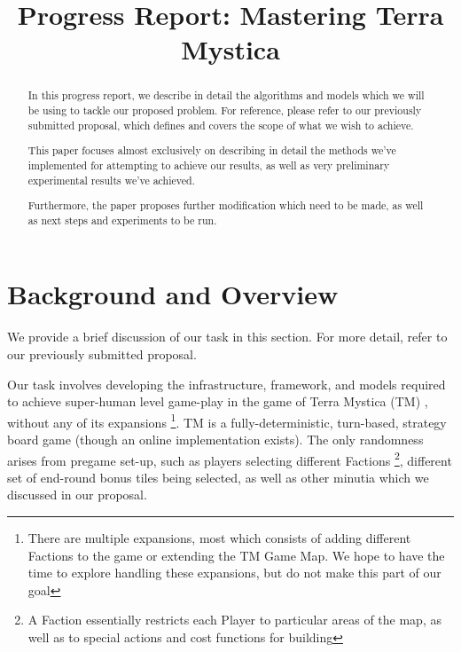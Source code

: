 \documentclass[8pt,twocolumn]{article}
\begin{document}
\title{Progress Report: Mastering Terra Mystica}


\thispagestyle{empty}

\begin{abstract}
\label{abstract}
In this progress report, we describe in detail the algorithms and models which we will be using to tackle our proposed problem. For reference, please refer to our previously submitted proposal, which defines and covers the scope of what we wish to achieve.

This paper focuses almost exclusively on describing in detail the methods we've implemented for attempting to achieve our results, as well as very preliminary experimental results we've achieved.

Furthermore, the paper proposes further modification which need to be made, as well as next steps and experiments to be run.
\end{abstract}

\section{Background and Overview}
\label{section:background_and_overview}
We provide a brief discussion of our task in this section. For more detail, refer to our previously submitted proposal.

Our task involves developing the infrastructure, framework, and models required to achieve super-human level game-play in the game of Terra Mystica (TM) \cite{TMBoardGeek}, without any of its expansions \footnote{There are multiple expansions, most which consists of adding different Factions to the game or extending the TM Game Map. We hope to have the time to explore handling these expansions, but do not make this part of our goal}. TM is a fully-deterministic, turn-based, strategy board game (though an online implementation exists). The only randomness arises from pregame set-up, such as players selecting different Factions \footnote{A Faction essentially restricts each Player to particular areas of the map, as well as to special actions and cost functions for building}, different set of end-round bonus tiles being selected, as well as other minutia which we discussed in our proposal.
\end{document}
